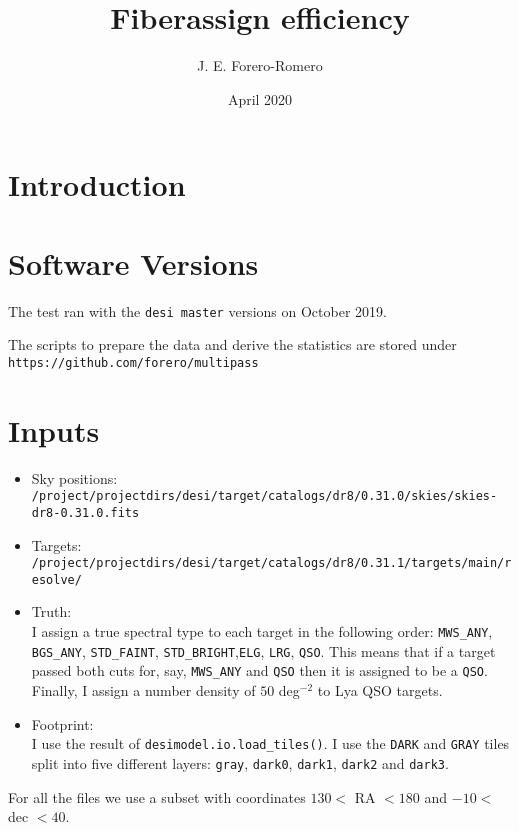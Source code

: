 \documentclass{article}
\title{Fiberassign efficiency}
\author{J. E. Forero-Romero}
\date{April 2020}
\begin{document}
\maketitle

\section{Introduction}


\section{Software Versions}

The test ran with the \verb'desi master' versions on October 2019.

The scripts to prepare the data and derive the statistics are stored
under \verb"https://github.com/forero/multipass"

\section{Inputs}

\begin{itemize}
\item Sky positions: \\
\verb"/project/projectdirs/desi/target/catalogs/dr8/0.31.0/skies/skies-dr8-0.31.0.fits"
\item Targets:\\
\verb"/project/projectdirs/desi/target/catalogs/dr8/0.31.1/targets/main/resolve/"
\item Truth:\\
I assign a true spectral type to each target in the
following order:
\verb'MWS_ANY', \verb'BGS_ANY', \verb'STD_FAINT',
\verb'STD_BRIGHT',\verb'ELG', \verb'LRG', \verb'QSO'.
This means that if a target passed both cuts for, say, \verb'MWS_ANY' and
\verb'QSO' then it is assigned to be a \verb'QSO'.
Finally, I assign a number density of $50$ deg$^{-2}$
to Lya QSO targets.

\item Footprint:\\
I use the result of \verb'desimodel.io.load_tiles()'.
I use the \verb"DARK" and \verb"GRAY" tiles split into 
five different layers: \verb`gray`,
\verb'dark0', \verb'dark1', \verb'dark2' and \verb'dark3'.

\end{itemize}
For all the files we use a subset with coordinates 
$130<$ RA $<180$ and
$-10<$ dec $<40$. 
\end{document}
